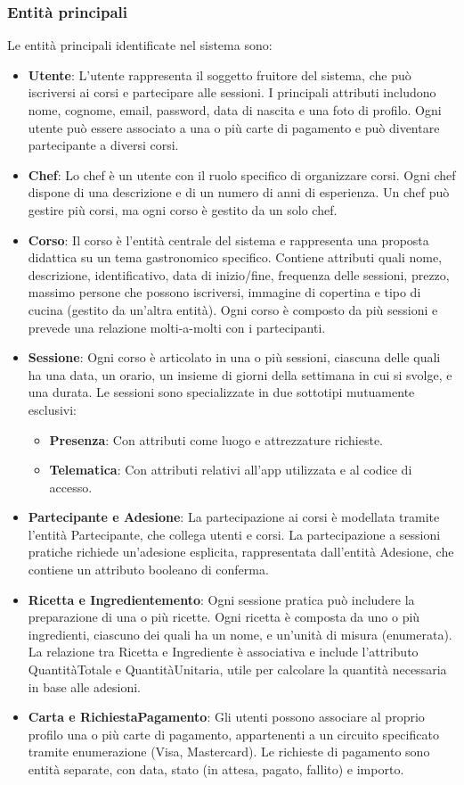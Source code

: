 \subsubsection{Entità principali}
Le entità principali identificate nel sistema sono:
\begin{itemize}
    \item \textbf{Utente}: L’utente rappresenta il soggetto fruitore del sistema, che può iscriversi ai corsi e partecipare alle sessioni. I principali attributi includono nome, cognome, email, password, data di nascita e una foto di profilo. Ogni utente può essere associato a una o più carte di pagamento e può diventare partecipante a diversi corsi.
    \item \textbf{Chef}: Lo chef è un utente con il ruolo specifico di organizzare corsi. Ogni chef dispone di una descrizione e di un numero di anni di esperienza. Un chef può gestire più corsi, ma ogni corso è gestito da un solo chef.
    \item \textbf{Corso}: Il corso è l'entità centrale del sistema e rappresenta una proposta didattica su un tema gastronomico specifico. Contiene attributi quali nome, descrizione, identificativo, data di inizio/fine, frequenza delle sessioni, prezzo, massimo persone che possono iscriversi, immagine di copertina e tipo di cucina (gestito da un'altra entità). Ogni corso è composto da più sessioni e prevede una relazione molti-a-molti con i partecipanti.
    \item \textbf{Sessione}: Ogni corso è articolato in una o più sessioni, ciascuna delle quali ha una data, un orario, un insieme di giorni della settimana in cui si svolge, e una durata. Le sessioni sono specializzate in due sottotipi mutuamente esclusivi:
    \begin{itemize}
        \item \textbf{Presenza}: Con attributi come luogo e attrezzature richieste.
        \item \textbf{Telematica}: Con attributi relativi all'app utilizzata e al codice di accesso.
    \end{itemize}
    \item \textbf{Partecipante e Adesione}: La partecipazione ai corsi è modellata tramite l’entità Partecipante, che collega utenti e corsi. La partecipazione a sessioni pratiche richiede un’adesione esplicita, rappresentata dall'entità Adesione, che contiene un attributo booleano di conferma.
    \item \textbf{Ricetta e Ingredientemento}: Ogni sessione pratica può includere la preparazione di una o più ricette. Ogni ricetta è composta da uno o più ingredienti, ciascuno dei quali ha un nome, e un'unità di misura (enumerata). La relazione tra Ricetta e Ingrediente è associativa e include l'attributo QuantitàTotale e QuantitàUnitaria, utile per calcolare la quantità necessaria in base alle adesioni.
    \item \textbf{Carta e RichiestaPagamento}: Gli utenti possono associare al proprio profilo una o più carte di pagamento, appartenenti a un circuito specificato tramite enumerazione (Visa, Mastercard). Le richieste di pagamento sono entità separate, con data, stato (in attesa, pagato, fallito) e importo.
\end{itemize}
